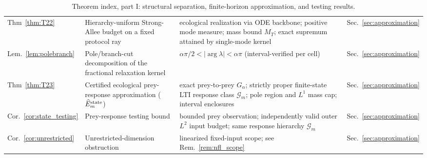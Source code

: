 \begin{table}[ht]
\begin{tabular}{p{1.15cm}p{2.1cm}p{4.85cm}p{1.95cm}}
    Thm~\ref{thm:T22} & Hierarchy-uniform Strong-Allee budget on a fixed protocol ray & ecological realization via ODE backbone; positive mode measure; mass bound $M_T$; exact supremum attained by single-mode kernel & Sec.~\ref{sec:approximation} \\
    Lem.~\ref{lem:polebranch} & Pole/branch-cut decomposition of the fractional relaxation kernel & $\alpha\pi/2<|\arg\lambda|<\alpha\pi$ (interval-verified per cell) & Sec.~\ref{sec:approximation} \\
    Thm~\ref{thm:T23} & Certified ecological prey-response approximation ($\widehat E_m^{\rm state}$) & exact prey-to-prey $G_\alpha$; strictly proper finite-state LTI response class $\mathcal G_m$; pole region and $L^1$ mass cap; interval enclosures & Sec.~\ref{sec:approximation} \\
    Cor.~\ref{cor:state_testing} & Prey-response testing bound & bounded prey observation; independently valid outer $L^2$ input budget; same response hierarchy $\mathcal G_m$ & Sec.~\ref{sec:approximation} \\
    Cor.~\ref{cor:unrestricted} & Unrestricted-dimension obstruction & linearized fixed-input scope; see Rem.~\ref{rem:nfl_scope} & Sec.~\ref{sec:approximation} \\
    \hline
  \end{tabular}
  \caption{Theorem index, part I: structural separation, finite-horizon approximation, and testing results.}
  \label{tab:theorem_index}
\end{table}

